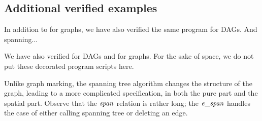 \subsection{Additional verified examples}
\label{sec:application}

{\color{magenta}
In addition to  for graphs, we have also verified the same program for DAGs.  And spanning...


 We have also verified  for DAGs and  for
graphs.  For the sake of space, we do not put these decorated program scripts here.

Unlike graph marking, the spanning tree algorithm changes the
structure of the graph, leading to a more complicated specification,
in both the pure part and the spatial part. Observe that the $\mathit{span}$ relation is
rather long; the $\mathit{e\_span}$ handles the case of either calling spanning tree or deleting an edge.
}

